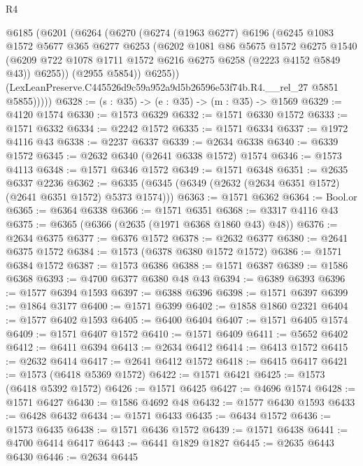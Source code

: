 \begin{lexlean}{R4}
\begin{coremodule}
        @6185
          (@6201
            (@6264
              (@6270
                (@6274
                  (@1963 @6277)
                  @6196
                  (@6245
                    @1083
                    @1572
                    @5677
                    @365
                    @6277
                    @6253
                    (@6202
                      @1081
                      @86
                      @5675
                      @1572
                      @6275
                      @1540
                      (@6209 @722 @1078 @1711 @1572 @6216 @6275 @6258 (@2223 @4152 @5849 @43))
                      @6255))
                  (@2955 @5854))
                @6255))
            (LexLeanPreserve.C445526d9c59a952a9d5b26596e53f74b.R4.__rel_27 @5851 @5855)))))
@6328 := (s : @35) -> (e : @35) -> (m : @35) -> @1569
@6329 := @4120 @1574
@6330 := @1573 @6329
@6332 := @1571 @6330 @1572
@6333 := @1571 @6332
@6334 := @2242 @1572
@6335 := @1571 @6334
@6337 := @1972 @4116 @43
@6338 := @2237 @6337
@6339 := @2634 @6338
@6340 := @6339 @1572
@6345 := @2632 @6340 (@2641 @6338 @1572) @1574
@6346 := @1573 @4113
@6348 := @1571 @6346 @1572
@6349 := @1571 @6348
@6351 := @2635 @6337 @2236
@6362 := @6335 (@6345 (@6349 (@2632 (@2634 @6351 @1572) (@2641 @6351 @1572) @5373 @1574)))
@6363 := @1571 @6362
@6364 := Bool.or
@6365 := @6364 @6338
@6366 := @1571 @6351
@6368 := @3317 @4116 @43
@6375 := @6365 (@6366 (@2635 (@1971 @6368 @1860 @43) @48))
@6376 := @2634 @6375
@6377 := @6376 @1572
@6378 := @2632 @6377
@6380 := @2641 @6375 @1572
@6384 := @1573 (@6378 @6380 @1572 @1572)
@6386 := @1571 @6384 @1572
@6387 := @1573 @6386
@6388 := @1571 @6387
@6389 := @1586 @6368
@6393 := @4700 @6377 @6380 @48 @43
@6394 := @6389 @6393
@6396 := @1577 @6394 @1593
@6397 := @6388 @6396
@6398 := @1571 @6397
@6399 := @1864 @3177
@6400 := @1571 @6399
@6402 := @1858 @1860 @2321
@6404 := @1577 @6402 @1593
@6405 := @6400 @6404
@6407 := @1571 @6405 @1574
@6409 := @1571 @6407 @1572
@6410 := @1571 @6409
@6411 := @5652 @6402
@6412 := @6411 @6394
@6413 := @2634 @6412
@6414 := @6413 @1572
@6415 := @2632 @6414
@6417 := @2641 @6412 @1572
@6418 := @6415 @6417
@6421 := @1573 (@6418 @5369 @1572)
@6422 := @1571 @6421
@6425 := @1573 (@6418 @5392 @1572)
@6426 := @1571 @6425
@6427 := @4696 @1574
@6428 := @1571 @6427
@6430 := @1586 @4692 @48
@6432 := @1577 @6430 @1593
@6433 := @6428 @6432
@6434 := @1571 @6433
@6435 := @6434 @1572
@6436 := @1573 @6435
@6438 := @1571 @6436 @1572
@6439 := @1571 @6438
@6441 := @4700 @6414 @6417
@6443 := @6441 @1829 @1827
@6445 := @2635 @6443 @6430
@6446 := @2634 @6445

\end{coremodule}
\end{lexlean}
